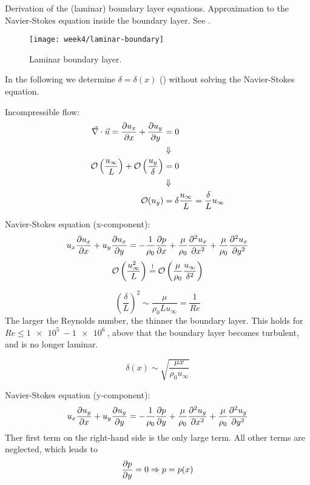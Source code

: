 Derivation of the (laminar) boundary layer equations. Approximation to the Navier-Stokes equation inside the boundary layer. See .

\begin{figure}[ht]
    \centering
    \texttt{[image: week4/laminar-boundary]}\\
    \caption{Laminar boundary layer.}
    \label{fig:laminar-boundary}
\end{figure}

In the following we determine $\delta = \delta(x)$ () without solving the Navier-Stokes equation.

Incompressible flow:
\begin{align}
\vec{\nabla}\cdot\vec{u} = \frac{\partial u_x}{\partial x} + \frac{\partial u_y}{\partial y} &= 0 \\
&\Downarrow\notag\\
\mathcal{O} \left(\frac{u_\infty}{L}\right) + \mathcal{O} \left(\frac{u_y}{\delta}\right) &= 0\\
&\Downarrow\notag\\
\mathcal{O}(u_y) &= \delta\frac{u_\infty}{L} = \frac{\delta}{L}u_\infty
\end{align}

Navier-Stokes equation (x-component):
\begin{equation}
u_x\frac{\partial u_x}{\partial x} + u_y\frac{\partial u_x}{\partial y} = -\frac{1}{\rho_0}\frac{\partial p}{\partial x} + \frac{\mu}{\rho_0}\frac{\partial^2 u_x}{\partial x^2} + \frac{\mu}{\rho_0}\frac{\partial^2 u_x}{\partial y^2}
\end{equation}
\begin{equation}
\mathcal{O} \left(\frac{u_\infty^2}{L}\right) \overset{!}{=} \mathcal{O} \left(\frac{\mu}{\rho_0}\frac{u_\infty}{\delta^2}\right)
\end{equation}

\begin{equation}
\left(\frac{\delta}{L}\right)^2 \sim \frac{\mu}{\rho_0 L u_\infty} = \frac{1}{Re}
\end{equation}
The larger the Reynolds number, the thinner the boundary layer. This holds for $Re \leq \SI{1e5}{}-\SI{1e6}{}$, above that the boundary layer becomes turbulent, and is no longer laminar.

\begin{equation}
\delta(x) \sim \sqrt{\frac{\mu x}{\rho_0 u_\infty}}
\end{equation}

Navier-Stokes equation (y-component):
\begin{equation}
u_x\frac{\partial u_y}{\partial x} + u_y\frac{\partial u_y}{\partial y} = -\frac{1}{\rho_0}\frac{\partial p}{\partial y} + \frac{\mu}{\rho_0}\frac{\partial^2 u_y}{\partial x^2} + \frac{\mu}{\rho_0}\frac{\partial^2 u_y}{\partial y^2}
\end{equation}
Ther first term on the right-hand side is the only large term. All other terms are neglected, which leads to
\begin{equation}
\frac{\partial p}{\partial y} = 0 \Rightarrow p = p(x)
\end{equation}

